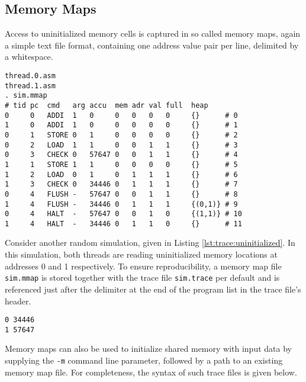 \subsection{Memory Maps}

Access to uninitialized memory cells is captured in so called memory maps, again a simple text file format, containing one address value pair per line, delimited by a whitespace.

\begin{lstlisting}[language={[concubine]Assembler}, caption={Output Trace Accessing Uninitialized Memory}, label={lst:trace:uninitialized}, xleftmargin=\parindent]
thread.0.asm
thread.1.asm
. sim.mmap
# tid pc  cmd   arg accu  mem adr val full  heap
0     0   ADDI  1   0     0   0   0   0     {}      # 0
1     0   ADDI  1   0     0   0   0   0     {}      # 1
0     1   STORE 0   1     0   0   0   0     {}      # 2
0     2   LOAD  1   1     0   0   1   1     {}      # 3
0     3   CHECK 0   57647 0   0   1   1     {}      # 4
1     1   STORE 1   1     0   0   0   0     {}      # 5
1     2   LOAD  0   1     0   1   1   1     {}      # 6
1     3   CHECK 0   34446 0   1   1   1     {}      # 7
0     4   FLUSH -   57647 0   0   1   1     {}      # 8
1     4   FLUSH -   34446 0   1   1   1     {(0,1)} # 9
0     4   HALT  -   57647 0   0   1   0     {(1,1)} # 10
1     4   HALT  -   34446 0   1   1   0     {}      # 11
\end{lstlisting}

Consider another random simulation, given in Listing \ref{lst:trace:uninitialized}.
In this simulation, both threads are reading uninitialized memory locations at addresses 0 and 1 respectively.
To ensure reproducibility, a memory map file \texttt{sim.mmap} is stored together with the trace file \texttt{sim.trace} per default and is referenced just after the delimiter at the end of the program list in the trace file's header.

\begin{lstlisting}[language={[concubine]Assembler}, caption={Output Memory Map of the Trace in Listing \ref{lst:trace:uninitialized}}, label={lst:mmap:uninitialized}, xleftmargin=0.39\textwidth]
0 34446
1 57647
\end{lstlisting}

Memory maps can also be used to initialize shared memory with input data by supplying the \texttt{-m} command line parameter, followed by a path to an existing memory map file.
For completeness, the syntax of such trace files is given below.

